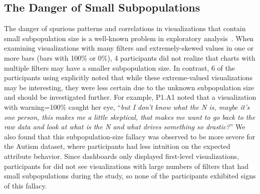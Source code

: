 \subsection{The Danger of Small Subpopulations}
The danger of spurious patterns and correlations in visualizations that contain small subpopulation size is a well-known problem in exploratory analysis~\cite{Binnig2017}. When examining visualizations with many filters and extremely-skewed values in one or more bars (bars with 100\% or 0\%), 4 \cluster participants did not realize that charts with multiple filters may have a smaller subpopulation size. In contrast, 6 of the participants using \system explicitly noted that while these extreme-valued visualizations may be interesting, they were less certain due to the unknown subpopulation size and should be investigated further. For example, P1.A1 noted that a visualization with warning=100\% caught her eye, ``\textit{but I don't know what the N is, maybe it's one person, this makes me a little skeptical, that makes me want to go back to the raw data and look at what is the N and what drives something so drastic?}'' We also found that this subpopulation-size fallacy was observed to be more severe for the Autism dataset, where participants had less intuition on the expected attribute behavior.  Since \BFS dashboards only displayed first-level visualizations, participants for \BFS did not see visualizations with large numbers of filters that had small subpopulations during the study, so none of the \BFS participants exhibited signs of this fallacy.

